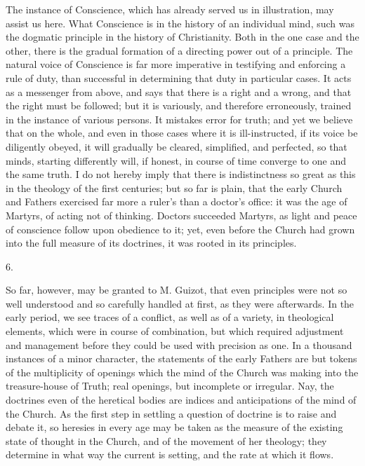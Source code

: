 The instance of Conscience, which has already served
us in illustration, may assist us here. What Conscience
is in the history of an individual mind, such was the
dogmatic principle in the history of Christianity. Both
in the one case and the other, there is the gradual
formation of a directing power out of a principle. The
natural voice of Conscience is far more imperative in
testifying and enforcing a rule of duty, than successful
in determining that duty in particular cases. It acts as
a messenger from above, and says that there is a right
and a wrong, and that the right must be followed; but it
is variously, and therefore erroneously, trained in the
instance of various persons. It mistakes error for truth;
and yet we believe that on the whole, and even in those
cases where it is ill-instructed, if its voice be
diligently obeyed, it will gradually be cleared,
simplified, and perfected, so that minds, starting
differently will, if honest, in course of time converge
to one and the same truth. I do not hereby imply that
there is indistinctness so great as this in the theology
of the first centuries; but so far is plain, that the
early Church and Fathers exercised far more a ruler's
than a doctor's office: it was the age of Martyrs, of
acting not of thinking. Doctors succeeded Martyrs, as
light and peace of conscience follow upon obedience to
it; yet, even before the Church had grown into the full
measure of its doctrines, it was rooted in its
principles.

6.

So far, however, may be granted to M. Guizot, that
even principles were not so well understood and so
carefully handled at first, as they were afterwards. In
the early period, we see traces of a conflict, as well as
of a variety, in theological elements, which were in
course of combination, but which required adjustment and
management before they could be used with precision
as one. In a thousand instances of a minor character, the
statements of the early Fathers are but tokens of the
multiplicity of openings which the mind of the Church was
making into the treasure-house of Truth; real openings,
but incomplete or irregular. Nay, the doctrines even of
the heretical bodies are indices and anticipations of the
mind of the Church. As the first step in settling a
question of doctrine is to raise and debate it, so
heresies in every age may be taken as the measure of the
existing state of thought in the Church, and of the
movement of her theology; they determine in what way the
current is setting, and the rate at which it flows.

